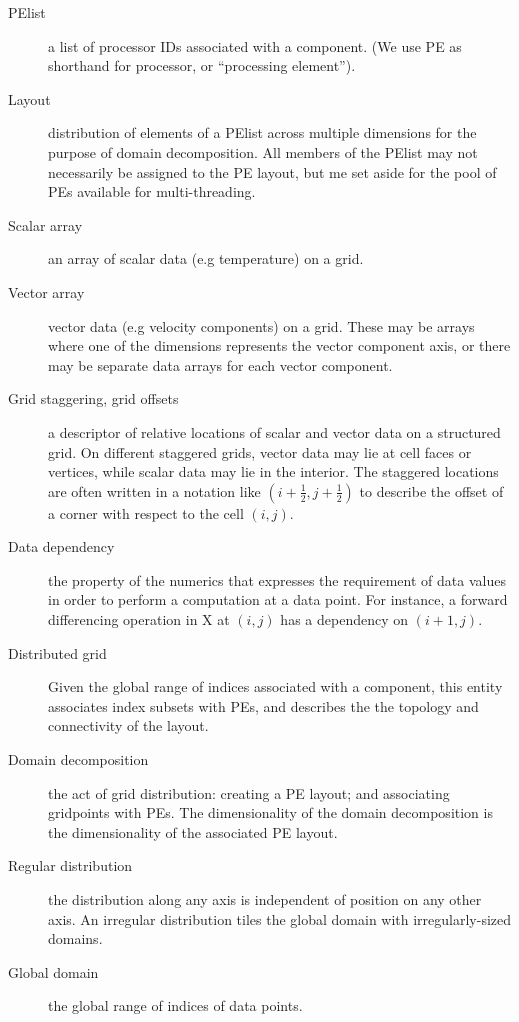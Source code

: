 
\begin{description}
\item[PElist] a list of processor IDs associated with a component. (We
  use PE as shorthand for processor, or ``processing element'').
\item[Layout] distribution of elements of a PElist across multiple
  dimensions for the purpose of domain decomposition. All members of
  the PElist may not necessarily be assigned to the PE layout, but me
  set aside for the pool of PEs available for multi-threading.
\item[Scalar array] an array of scalar data (e.g temperature) on a
  grid.
\item[Vector array] vector data (e.g velocity components) on a
  grid. These may be arrays where one of the dimensions represents the
  vector component axis, or there may be separate data arrays for each
  vector component.
\item[Grid staggering, grid offsets] a descriptor of relative locations
  of scalar and vector data on a structured grid. On different
  staggered grids, vector data may lie at cell faces or vertices,
  while scalar data may lie in the interior. The staggered locations
  are often written in a notation like $(i+\frac12,j+\frac12)$ to
  describe the offset of a corner with respect to the cell $(i,j)$.
\item[Data dependency] the property of the numerics that expresses the
  requirement of data values in order to perform a
  computation at a data point. For instance, a forward differencing
  operation in X at $(i,j)$ has a dependency on $(i+1,j)$.
\item[Distributed grid] Given the global range of indices associated
  with a component, this entity associates index subsets with PEs, and
  describes the the topology and connectivity of the layout.
\item[Domain decomposition] the act of grid distribution: creating a
  PE layout; and associating gridpoints with PEs. The dimensionality
  of the domain decomposition is the dimensionality of the associated
  PE layout.
\item[Regular distribution] the distribution along any axis is
  independent of position on any other axis. An irregular distribution
  tiles the global domain with irregularly-sized domains.
\item[Global domain] the global range of indices of data points.

\end{description}
